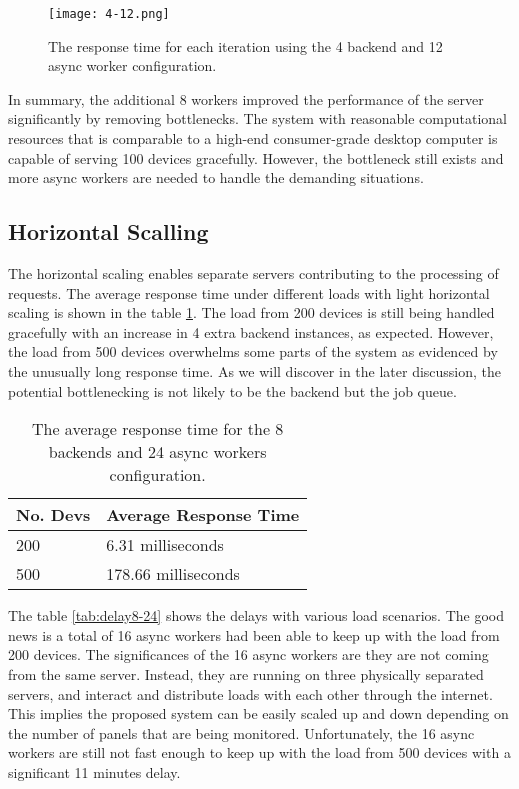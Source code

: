 \documentclass[../thesis.tex]{subfiles}
\begin{document}
\begin{figure}[!ht]
\centering
\texttt{[image: 4-12.png]}
\caption{The response time for each iteration using the 4 backend and 12 async worker configuration.}
\label{fig:4-12}
\end{figure}

In summary, the additional 8 workers improved the performance of the server significantly by removing bottlenecks. The system with reasonable computational resources that is comparable to a high-end consumer-grade desktop computer is capable of serving 100 devices gracefully. However, the bottleneck still exists and more async workers are needed to handle the demanding situations.

\subsection{Horizontal Scalling}
\label{sec:horizontal}

The horizontal scaling enables separate servers contributing to the processing of requests. The average response time under different loads with light horizontal scaling is shown in the table \ref{tab:avg8-24}. The load from 200 devices is still being handled gracefully with an increase in 4 extra backend instances, as expected. However, the load from 500 devices overwhelms some parts of the system as evidenced by the unusually long response time. As we will discover in the later discussion, the potential bottlenecking is not likely to be the backend but the job queue.

\begin{table}[h!]
\begin{center}
\caption{The average response time for the 8 backends and 24 async workers configuration.}
\label{tab:avg8-24}
\begin{tabular}{l|l}
\toprule
\textbf{No. Devs} & \textbf{Average Response Time}\\
\midrule
200 & 6.31 milliseconds\\
500 & 178.66 milliseconds\\
\bottomrule
\end{tabular}
\end{center}
\end{table}

The table \ref{tab:delay8-24} shows the delays with various load scenarios. The good news is a total of 16 async workers had been able to keep up with the load from 200 devices. The significances of the 16 async workers are they are not coming from the same server. Instead, they are running on three physically separated servers, and interact and distribute loads with each other through the internet. This implies the proposed system can be easily scaled up and down depending on the number of panels that are being monitored. Unfortunately, the 16 async workers are still not fast enough to keep up with the load from 500 devices with a significant 11 minutes delay.
\end{document}
